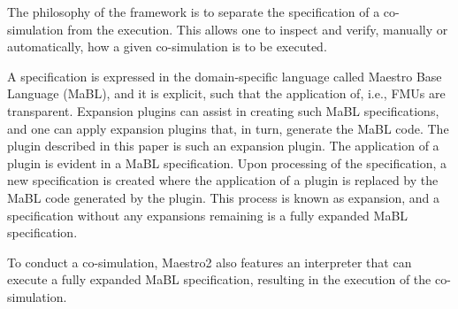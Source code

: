 The philosophy of the framework is to separate the specification of a co-simulation from the execution. This allows one to inspect and verify, manually or automatically, how a given co-simulation is to be executed. 

A specification is expressed in the domain-specific language called Maestro Base Language (MaBL), and it is explicit, such that the application of, i.e., FMUs are transparent. Expansion plugins can assist in creating such MaBL specifications, and one can apply expansion plugins that, in turn, generate the MaBL code. The plugin described in this paper is such an expansion plugin. The application of a plugin is evident in a MaBL specification. Upon processing of the specification, a new specification is created where the application of a plugin is replaced by the MaBL code generated by the plugin. This process is known as expansion, and a specification without any expansions remaining is a fully expanded MaBL specification. 

To conduct a co-simulation, Maestro2 also features an interpreter that can execute a fully expanded MaBL specification, resulting in the execution of the co-simulation.